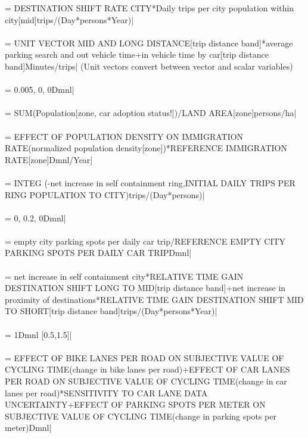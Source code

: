  = DESTINATION SHIFT RATE CITY*Daily trips per city population within city[mid]trips/(Day*persons*Year)| \\ \\ 
 = UNIT VECTOR MID AND LONG DISTANCE[trip distance band]*average parking search and out vehicle time+in vehicle time by car[trip distance band]Minutes/trips| (Unit vectors convert between vector and scalar variables) \\ \\ 
 = 0.005, 0, 0Dmnl| \\ \\ 
 = SUM(Population[zone, car adoption status!])/LAND AREA[zone]persons/ha| \\ \\ 
 = EFFECT OF POPULATION DENSITY ON IMMIGRATION RATE(normalized population density[zone])*REFERENCE IMMIGRATION RATE[zone]Dmnl/Year| \\ \\ 
 =  INTEG (-net increase in self containment ring,INITIAL DAILY TRIPS PER RING POPULATION TO CITY)trips/(Day*persons)| \\ \\ 
 = 0, 0.2, 0Dmnl| \\ \\ 
 = empty city parking spots per daily car trip/REFERENCE EMPTY CITY PARKING SPOTS PER DAILY CAR TRIPDmnl| \\ \\ 
 = net increase in self containment city*RELATIVE TIME GAIN DESTINATION SHIFT LONG TO MID[trip distance band]+net increase in proximity of destinations*RELATIVE TIME GAIN DESTINATION SHIFT MID TO SHORT[trip distance band]trips/(Day*persons*Year)| \\ \\ 
 = 1Dmnl [0.5,1.5]| \\ \\ 
 = EFFECT OF BIKE LANES PER ROAD ON SUBJECTIVE VALUE OF CYCLING TIME(change in bike lanes per road)+EFFECT OF CAR LANES PER ROAD ON SUBJECTIVE VALUE OF CYCLING TIME(change in car lanes per road)*SENSITIVITY TO CAR LANE DATA UNCERTAINTY+EFFECT OF PARKING SPOTS PER METER ON SUBJECTIVE VALUE OF CYCLING TIME(change in parking spots per meter)Dmnl| \\ \\ 

